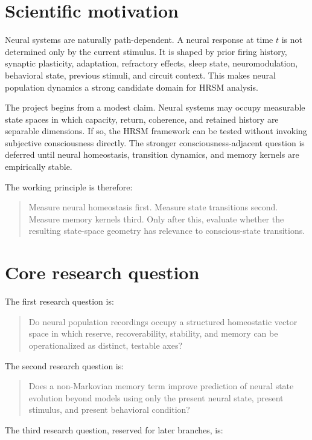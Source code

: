 \documentclass[11pt]{article}
\begin{document}
\section{Scientific motivation}

Neural systems are naturally path-dependent. A neural response at time $t$ is not determined only by the current stimulus. It is shaped by prior firing history, synaptic plasticity, adaptation, refractory effects, sleep state, neuromodulation, behavioral state, previous stimuli, and circuit context. This makes neural population dynamics a strong candidate domain for HRSM analysis.

The project begins from a modest claim. Neural systems may occupy measurable state spaces in which capacity, return, coherence, and retained history are separable dimensions. If so, the HRSM framework can be tested without invoking subjective consciousness directly. The stronger consciousness-adjacent question is deferred until neural homeostasis, transition dynamics, and memory kernels are empirically stable.

The working principle is therefore:

\begin{quote}
Measure neural homeostasis first. Measure state transitions second. Measure memory kernels third. Only after this, evaluate whether the resulting state-space geometry has relevance to conscious-state transitions.
\end{quote}

\section{Core research question}

The first research question is:

\begin{quote}
Do neural population recordings occupy a structured homeostatic vector space in which reserve, recoverability, stability, and memory can be operationalized as distinct, testable axes?
\end{quote}

The second research question is:

\begin{quote}
Does a non-Markovian memory term improve prediction of neural state evolution beyond models using only the present neural state, present stimulus, and present behavioral condition?
\end{quote}

The third research question, reserved for later branches, is:
\end{document}

